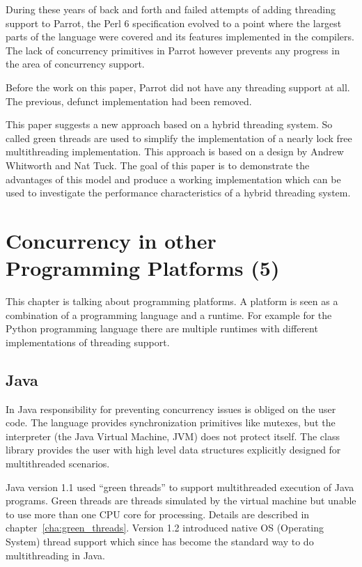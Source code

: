 \documentclass[bachelor,english]{hgbthesis}
\begin{document}
During these years of back and forth and failed attempts of adding threading support to Parrot, the Perl 6 specification evolved to a point where the largest parts of the language were covered and its features implemented in the compilers. The lack of concurrency primitives in Parrot however prevents any progress in the area of concurrency support.

Before the work on this paper, Parrot did not have any threading support at all. The previous, defunct implementation had been removed.

This paper suggests a new approach based on a hybrid threading system. So called green threads are used to simplify the implementation of a nearly lock free multithreading implementation. This approach is based on a design by Andrew Whitworth and Nat Tuck. The goal of this paper is to demonstrate the advantages of this model and produce a working implementation which can be used to investigate the performance characteristics of a hybrid threading system.

\chapter{Concurrency in other Programming Platforms (5)}

This chapter is talking about programming platforms. A platform is seen as a combination of a programming language and a runtime. For example for the Python programming language there are multiple runtimes with different implementations of threading support.

\section{Java}

In Java responsibility for preventing concurrency issues is obliged on the user code. The language provides synchronization primitives like mutexes, but the interpreter (the Java Virtual Machine, JVM) does not protect itself. The class library provides the user with high level data structures explicitly designed for multithreaded scenarios.

Java version 1.1 used ``green threads'' to support multithreaded execution of Java programs. Green threads are threads simulated by the virtual machine but unable to use more than one CPU core for processing. Details are described in chapter~\ref{cha:green_threads}. Version 1.2 introduced native OS (Operating System) thread support which since has become the standard way to do multithreading in Java\cite{JavaThreadManual}.
\end{document}

